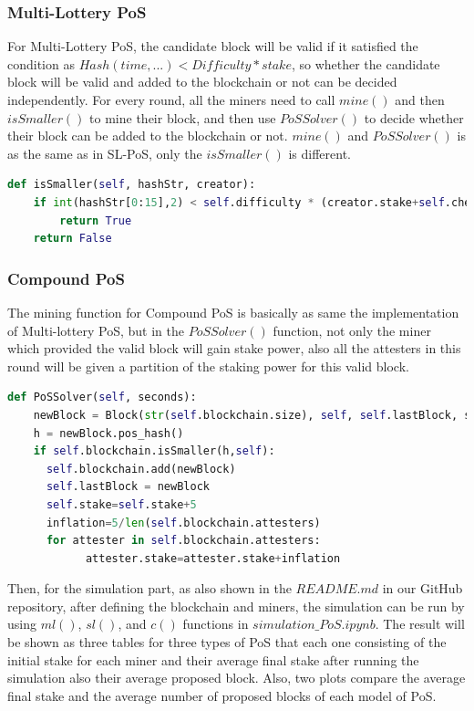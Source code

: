 \documentclass{article}
\begin{document}
\subsubsection{Multi-Lottery \gls{PoS}}
For Multi-Lottery \gls{PoS}, the candidate block will be valid if it satisfied the condition as $Hash(time, . . . ) < Difficulty * stake$, so whether the candidate block will be valid and added to the blockchain or not can be decided independently. For every round, all the miners need to call $mine()$ and then $isSmaller()$ to mine their block, and then use $PoSSolver()$ to decide whether their block can be added to the blockchain or not. $mine()$ and $PoSSolver()$ is as the same as in SL-PoS, only the $isSmaller()$ is different.

\begin{lstlisting}[language=Python, caption=Multi-Lottery \gls{PoS}]
def isSmaller(self, hashStr, creator):
    if int(hashStr[0:15],2) < self.difficulty * (creator.stake+self.checkMiner(creator)):
        return True
    return False
\end{lstlisting}

\subsubsection{Compound \gls{PoS}}
The mining function for Compound \gls{PoS} is basically as same the implementation of Multi-lottery \gls{PoS}, but in the $PoSSolver()$ function, not only the miner which provided the valid block will gain stake power, also all the attesters in this round will be given a partition of the staking power for this valid block.

\begin{lstlisting}[language=Python, caption=Compound \gls{PoS}]
def PoSSolver(self, seconds):
    newBlock = Block(str(self.blockchain.size), self, self.lastBlock, seconds)
    h = newBlock.pos_hash()
    if self.blockchain.isSmaller(h,self):
      self.blockchain.add(newBlock)
      self.lastBlock = newBlock
      self.stake=self.stake+5
      inflation=5/len(self.blockchain.attesters)
      for attester in self.blockchain.attesters:
            attester.stake=attester.stake+inflation
\end{lstlisting}

Then, for the simulation part, as also shown in the $README.md$ in our GitHub repository, after defining the blockchain and miners, the simulation can be run by using $ml()$, $sl()$, and $c()$ functions in $simulation\_PoS.ipynb$. The result will be shown as three tables for three types of PoS that each one consisting of the initial stake for each miner and their average final stake after running the simulation also their average proposed block. Also, two plots compare the average final stake and the average number of proposed blocks of each model of \gls{PoS}.
\end{document}

